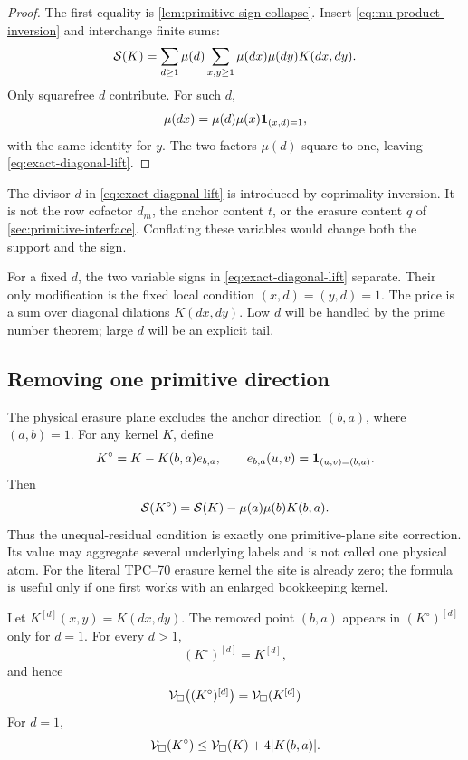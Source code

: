 \begin{proof}
The first equality is \cref{lem:primitive-sign-collapse}.  Insert
\eqref{eq:mu-product-inversion} and interchange finite sums:
\[
 \mathcal S(K)
 =
 \sum_{d\ge1}\mu(d)
 \sum_{x,y\ge1}\mu(dx)\mu(dy)K(dx,dy).
\]
Only squarefree \(d\) contribute.  For such \(d\),
\[
 \mu(dx)
 =
 \mu(d)\mu(x)\mathbf 1_{(x,d)=1},
\]
with the same identity for \(y\).  The two factors \(\mu(d)\) square to
one, leaving \eqref{eq:exact-diagonal-lift}.
\end{proof}

\begin{remark}
The divisor \(d\) in \eqref{eq:exact-diagonal-lift} is introduced by
coprimality inversion.  It is not the row cofactor \(d_m\), the anchor
content \(t\), or the erasure content \(q\) of
\cref{sec:primitive-interface}.  Conflating these variables would change
both the support and the sign.
\end{remark}

\begin{remark}
For a fixed \(d\), the two variable signs in
\eqref{eq:exact-diagonal-lift} separate.  Their only modification is the
fixed local condition \((x,d)=(y,d)=1\).  The price is a sum over diagonal
dilations \(K(dx,dy)\).  Low \(d\) will be handled by the prime number
theorem; large \(d\) will be an explicit tail.
\end{remark}

\subsection{Removing one primitive direction}

The physical erasure plane excludes the anchor direction \((b,a)\), where
\((a,b)=1\).  For any kernel \(K\), define
\[
 K^\circ=K-K(b,a)e_{b,a},
 \qquad
 e_{b,a}(u,v)=\mathbf 1_{(u,v)=(b,a)}.
\]
Then
\begin{equation}
 \mathcal S(K^\circ)
 =
 \mathcal S(K)-\mu(a)\mu(b)K(b,a).
\label{eq:anchor-point-removal}
\end{equation}
Thus the unequal-residual condition is exactly one primitive-plane site
correction.  Its value may aggregate several underlying labels and is not
called one physical atom.  For the literal TPC--70 erasure kernel the site
is already zero; the formula is useful only if one first works with an
enlarged bookkeeping kernel.

\begin{lemma}
\label{lem:anchor-diagonal-visibility}
Let \(K^{[d]}(x,y)=K(dx,dy)\).  The removed point \((b,a)\) appears in
\((K^\circ)^{[d]}\) only for \(d=1\).  For every \(d>1\),
\[
 (K^\circ)^{[d]}=K^{[d]},
\]
and hence
\[
 \mathcal V_\square\bigl((K^\circ)^{[d]}\bigr)
 =
 \mathcal V_\square(K^{[d]})
\]
For \(d=1\),
\[
 \mathcal V_\square(K^\circ)
 \le
 \mathcal V_\square(K)+4|K(b,a)|.
\]
\end{lemma}


